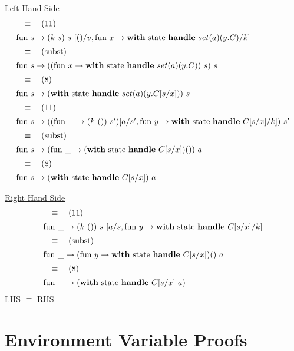 \documentclass[logo,bsc,singlespacing,parskip]{infthesis}
\begin{document}
\underline{Left Hand Side}
\[ 
\begin{array}{l}
\quad\equiv\quad (11) \\[5pt]
\text{fun } s \rightarrow (k\ s)\ s\ [()/v, \text{fun } x \rightarrow \text{\textbf{with} state \textbf{handle} } set(a)(y.C)/k] \\[5pt]
\quad\equiv\quad (\text{subst}) \\[5pt]
\text{fun } s \rightarrow ((\text{fun } x \rightarrow \text{\textbf{with} state \textbf{handle} } set(a)(y.C))\ s)\ s \\[5pt]
\quad\equiv\quad (8) \\[5pt]
\text{fun } s \rightarrow (\text{\textbf{with} state \textbf{handle} } set(a)(y.C[s/x]))\ s \\[5pt]
\quad\equiv\quad (11) \\[5pt]
\text{fun } s \rightarrow ((\text{fun } \_ \rightarrow (k\ ())\ s')[a/s', \text{fun } y \rightarrow \text{\textbf{with} state \textbf{handle} } C[s/x]/k])\ s' \\[5pt]
\quad\equiv\quad (\text{subst}) \\[5pt]
\text{fun } s \rightarrow (\text{fun } \_ \rightarrow (\text{\textbf{with} state \textbf{handle} } C[s/x]) ())\ a \\[5pt]
\quad\equiv\quad (8) \\[5pt]
\text{fun } s \rightarrow (\text{\textbf{with} state \textbf{handle} } C[s/x])\ a
\end{array}
\]


\underline{Right Hand Side}
\[ 
\begin{array}{l}
\quad\equiv\quad (11) \\[5pt]
\text{fun }\_ \rightarrow (k\ ())\ s\ [a/s, \text{fun } y \rightarrow \text{\textbf{with} state \textbf{handle} } C[s/x]/k] \\[5pt]
\quad\equiv\quad (\text{subst}) \\[5pt]
\text{fun }\_ \rightarrow (\text{fun } y \rightarrow \text{\textbf{with} state \textbf{handle} } C[s/x]) ()\ a \\[5pt]
\quad\equiv\quad (8) \\[5pt]
\text{fun }\_ \rightarrow (\text{\textbf{with} state \textbf{handle} } C[s/x]\ a)
\end{array}
\]
LHS $\equiv$ RHS

\section{Environment Variable Proofs} \label{environment-variable-proofs}
\end{document}
